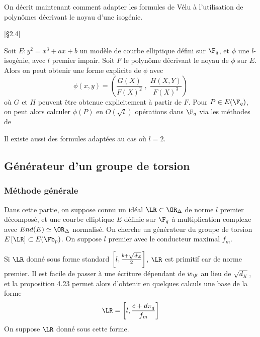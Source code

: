 On décrit maintenant comment adapter les formules de Vélu à l'utilisation de polynômes décrivant le noyau d'une isogénie.

\begin{Prop}\cite{Kohel}[\S 2.4]
	
	Soit $E : y^2 = x^3 + ax + b$ un modèle de courbe elliptique défini sur $\F_{q}$, et $\phi$ une $l$-isogénie, avec $l$ premier impair. Soit $F$ le polynôme décrivant le noyau de $\phi$ sur $E$. Alors on peut obtenir une forme explicite de $\phi$ avec
	\begin{equation*}
		\phi(x,y) = \left( \frac{G(X)}{F(X)^2}\;,\;\frac{H(X,Y)}{F(X)^3}\right) 
	\end{equation*}
	où $G$ et $H$ peuvent être obtenue explicitement à partir de $F$. Pour $P\in E(\F_{q})$, on peut alors calculer $\phi(P)$ en $O(\sqrt{l})$ opérations dans $\F_{q}$ via les méthodes de \cite{Velusqrt}
\end{Prop}

\begin{Rem}
	Il existe aussi des formules adaptées au cas où $l = 2$.
\end{Rem}










\subsection{Générateur d'un groupe de torsion}





\subsubsection{Méthode générale}

Dans cette partie, on suppose connu un idéal $\LR\subset\OR_{\Delta}$ de norme $l$ premier décomposé, et une courbe elliptique $E$ définie sur $\F_{q}$ à multiplication complexe avec $End(E)\simeq\OR_{\Delta}$ normalisé. On cherche un générateur du groupe de torsion $E\left[ \LR\right]\subset E(\Fb_{p})$. On suppose $l$ premier avec le conducteur maximal $f_{m}$.

\begin{Rem}
	Si $\LR$ donné sous forme standard $\left[ l, \frac{b + \sqrt{d_{\K}}}{2}\right]$, $\LR$ est primitif car de norme premier. Il est facile de passer à une écriture dépendant de $w_{\K}$ au lieu de $\sqrt{d_{K}}$, et la proposition 4.23 permet alors d'obtenir en quelques calculs une base de la forme 
	\begin{equation*}
		\LR = \left[ l, \frac{c + d\pi_{q}}{f_{m}}\right]
	\end{equation*}
	On suppose $\LR$ donné sous cette forme. 
\end{Rem}

